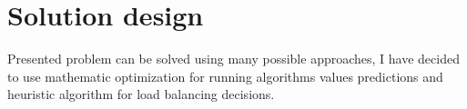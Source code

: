 \chapter{Solution design}\label{ch:solution-design}
Presented problem can be solved using many possible approaches,
I have decided to use mathematic optimization for running algorithms values predictions
and heuristic algorithm for load balancing decisions.





